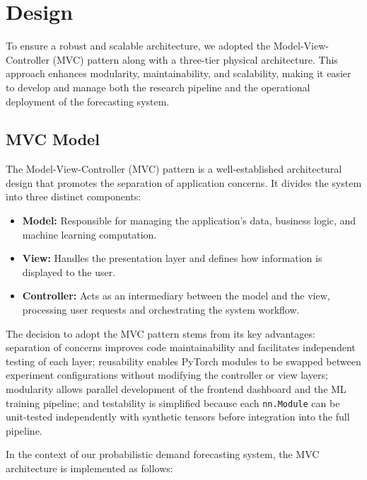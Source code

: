 \chapter{Design}
\label{chap:design}

To ensure a robust and scalable architecture, we adopted the Model-View-Controller
(MVC) pattern along with a three-tier physical architecture. This approach
enhances modularity, maintainability, and scalability, making it easier to
develop and manage both the research pipeline and the operational deployment
of the forecasting system.

\section{MVC Model}
\label{sec:mvc}

The Model-View-Controller (MVC) pattern is a well-established architectural
design that promotes the separation of application concerns. It divides the
system into three distinct components:

\begin{itemize}
  \item \textbf{Model:} Responsible for managing the application's data,
        business logic, and machine learning computation. 

  \item \textbf{View:} Handles the presentation layer and defines how
        information is displayed to the user. 

  \item \textbf{Controller:} Acts as an intermediary between the model
        and the view, processing user requests and orchestrating the
        system workflow. 
\end{itemize}

The decision to adopt the MVC pattern stems from its key advantages:
separation of concerns improves code maintainability and facilitates
independent testing of each layer; reusability enables PyTorch modules
to be swapped between experiment configurations without modifying the
controller or view layers; modularity allows parallel development of the
frontend dashboard and the ML training pipeline; and testability is
simplified because each \texttt{nn.Module} can be unit-tested independently
with synthetic tensors before integration into the full pipeline.

In the context of our probabilistic demand forecasting system, the MVC
architecture is implemented as follows:

